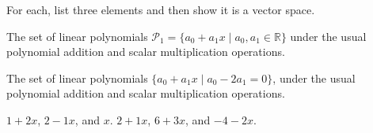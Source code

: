 
\begin{Exercise}[
name={},
title={}, 
difficulty=0,
origin={by Jim Hefferon \cite{JH}}]
For each, list three elements and then show it is a vector space.

\Question The set of linear polynomials
        \( \mathcal{P}_1=\{a_0+a_1x\;|\; a_0,a_1\in\mathbb{R}\} \) under the
        usual polynomial addition and scalar multiplication operations.

\Question The set of linear polynomials
        \( \{a_0+a_1x\;|\; a_0-2a_1=0\} \), under the
        usual polynomial addition and scalar multiplication operations.

\end{Exercise}

\begin{Answer}
\Question $1+2x$, $2-1x$, and $x$.
\Question $2+1x$, $6+3x$, and $-4-2x$.


\end{Answer}
